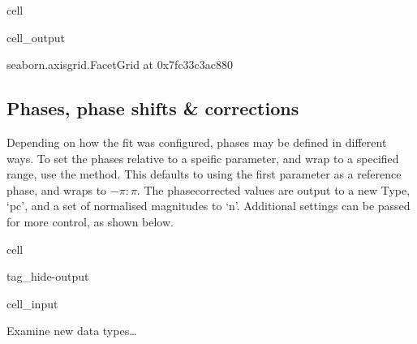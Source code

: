 \documentclass[letterpaper,table,10pt,english]{jupyterBook}
\begin{document}
\begin{sphinxuseclass}{cell}
\begin{sphinxVerbatimOutput}
\begin{sphinxuseclass}{cell_output}
\begin{sphinxVerbatim}[commandchars=\\\{\}]
\PYGZlt{}seaborn.axisgrid.FacetGrid at 0x7fc33c3ac880\PYGZgt{}
\end{sphinxVerbatim}

\noindent{}

\end{sphinxuseclass}\end{sphinxVerbatimOutput}

\end{sphinxuseclass}

\subsection{Phases, phase shifts \& corrections}
\label{\detokenize{part2/case-study-C2H4_290723:phases-phase-shifts-corrections}}
\sphinxAtStartPar
Depending on how the fit was configured, phases may be defined in different ways. To set the phases relative to a speific parameter, and wrap to a specified range, use the  method. This defaults to using the first parameter as a reference phase, and wraps to \(-\pi:\pi\). The phase\sphinxhyphen{}corrected values are output to a new Type, ‘pc’, and a set of normalised magnitudes to ‘n’. Additional settings can be passed for more control, as shown below.

\begin{sphinxuseclass}{cell}
\begin{sphinxuseclass}{tag_hide-output}\begin{sphinxVerbatimInput}

\begin{sphinxuseclass}{cell_input}
\begin{sphinxVerbatim}[commandchars=\\\{\}]
 
\end{sphinxVerbatim}

\end{sphinxuseclass}\end{sphinxVerbatimInput}

\end{sphinxuseclass}
\end{sphinxuseclass}
\sphinxAtStartPar
Examine new data types…
\end{document}
